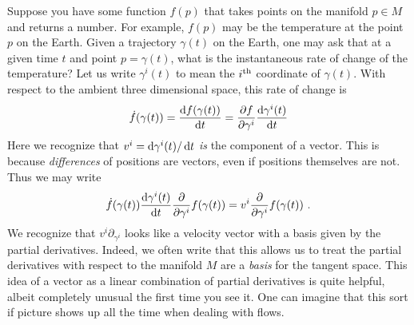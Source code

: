 \documentclass[12pt, oneside]{report}    %
\begin{document}
Suppose you have some function $f(p)$ that takes points on the manifold $p\in M$ and returns a number. For example, $f(p)$ may be the temperature at the point $p$ on the Earth. Given a trajectory $\gamma(t)$ on the Earth, one may ask that at a given time $t$ and point $p=\gamma(t)$, what is the instantaneous rate of change of the temperature? Let us write $\gamma^i(t)$ to mean the $i^\textnormal{th}$ coordinate of $\gamma(t)$.
% 
With respect to the ambient three dimensional space, this rate of change is
\begin{align}
    \dot f(\gamma(t)) = \frac{\operatorname{d}\!{f(\gamma(t))}}{\operatorname{d}\!{t}} = 
    \frac{\partial f}{\partial \gamma^i}
    \frac{\operatorname{d}\!{\gamma^i(t)}}{\operatorname{d}\!{t}}
\end{align}
Here we recognize that $v^i= \operatorname{d}\!{\gamma^i(t)}/\operatorname{d}\!{t}$ \emph{is} the component of a vector. This is because \emph{differences} of positions are vectors, even if positions themselves are not. Thus we may write
\begin{align}
    \dot f(\gamma(t)) %
    \frac{\D{\gamma^i(t)}}{\D{t}}
    \frac{\partial}{\partial \gamma^i}
    f(\gamma(t))
    =
    v^i
    \frac{\partial}{\partial \gamma^i}
    f(\gamma(t)) \ .
\end{align}
We recognize that $v^i \partial_{\gamma^i}$ looks like a velocity vector with a basis given by the partial derivatives. Indeed, we often write that this allows us to treat the partial derivatives with respect to the manifold $M$ are a \emph{basis} for the tangent space. This idea of a vector as a linear combination of partial derivatives is quite helpful, albeit completely unusual the first time you see it. One can imagine that this sort if picture shows up all the time when dealing with flows.
\end{document}
